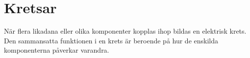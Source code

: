 \chapter{Kretsar}
\label{ch:kretsar}

När flera likadana eller olika komponenter kopplas ihop bildas en elektrisk
krets.
Den sammansatta funktionen i en krets är beroende på hur de enskilda
komponenterna påverkar varandra.

